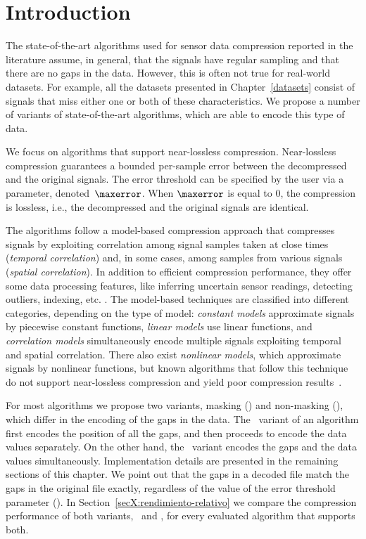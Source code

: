 

\section{Introduction}
\label{algo:overview}


The state-of-the-art algorithms used for sensor data compression reported in the literature \cite{AnEva2013, Signal2016} assume, in general, that the signals have regular sampling and that there are no gaps in the data. However, this is often not true for real-world datasets. For example, all the datasets presented in Chapter~\ref{datasets} consist of signals that miss either one or both of these characteristics. We propose a number of variants of state-of-the-art algorithms, which are able to encode this type of data. 


We focus on algorithms that support near-lossless compression. Near-lossless compression guarantees a bounded per-sample error between the decompressed and the original signals. The error threshold can be specified by the user via a parameter, denoted~$\maxerror$. When $\maxerror$ is equal to 0, the compression is lossless, i.e., the decompressed and the original signals are identical.


The algorithms follow a model-based compression approach that compresses signals by exploiting correlation among signal samples taken at close times (\textit{temporal correlation}) and, in some cases, among samples from various signals (\textit{spatial correlation}). In addition to efficient compression performance, they offer some data processing features, like inferring uncertain sensor readings, detecting outliers, indexing, etc. \cite{AnEva2013}. The model-based techniques are classified into different categories, depending on the type of model: \textit{constant models} approximate signals by piecewise constant functions, \textit{linear models} use linear functions, and \textit{correlation models} simultaneously encode multiple signals exploiting temporal and spatial correlation. There also exist \textit{nonlinear models}, which approximate signals by nonlinear functions, but known algorithms that follow this technique do not support near-lossless compression and yield poor compression results~\cite{AnEva2013}. 


For most algorithms we propose two variants, masking (\maskalgo) and non-masking (\NOmaskalgo), which differ in the encoding of the gaps in the data. The \maskalgo\ variant of an algorithm first encodes the position of all the gaps, and then proceeds to encode the data values separately. On the other hand, the \NOmaskalgo\ variant encodes the gaps and the data values simultaneously. Implementation details are presented in the remaining sections of this chapter. We point out that the gaps in a decoded file match the gaps in the original file exactly, regardless of the value of the error threshold parameter (\maxerror). In Section~\ref{secX:rendimiento-relativo} we compare the compression performance of both variants, \maskalgo\ and \NOmaskalgo, for every evaluated algorithm that supports both.


